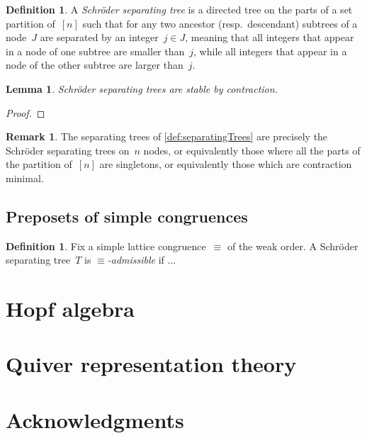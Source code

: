 \documentclass{amsart}
\newtheorem{lemma}[theorem]{Lemma}
\theoremstyle{definition}
\newtheorem{definition}[theorem]{Definition}
\newtheorem{remark}[theorem]{Remark}
\newcommand{\darkblue}{\color{darkblue}} %
\newcommand{\defn}[1]{\textsl{\darkblue #1}} %
\newcommand{\vincent}[1]{\todo[color=blue!30]{#1 \\ \hfill --- V.}}
\begin{document}
\begin{definition}
\label{def:ShcroderSeparatingTree}
A \defn{Schröder separating tree} is a directed tree on the parts of a set partition of~$[n]$ such that for any two ancestor (resp.~descendant) subtrees of a node~$J$ are separated by an integer~$j \in J$, meaning that all integers that appear in a node of one subtree are smaller than~$j$, while all integers that appear in a node of the other subtree are larger than~$j$.
\end{definition}

\begin{lemma}
\label{lem:contractionSchroderSeparatingTree}
Schröder separating trees are stable by contraction.
\end{lemma}

\begin{proof}
\vincent{todo}
\end{proof}

\begin{remark}
The separating trees of \cref{def:separatingTrees} are precisely the Schröder separating trees on~$n$ nodes, or equivalently those where all the parts of the partition of~$[n]$ are singletons, or equivalently those which are contraction minimal.
\end{remark}


\subsection{Preposets of simple congruences}
\label{subsec:preposetsSimpleCongruences}

\begin{definition}
\label{def:admissibleSchroderSeparatingTrees}
Fix a simple lattice congruence~$\equiv$ of the weak order.
A Schröder separating tree~$T$ is \defn{$\equiv$-admissible} if ...
\vincent{todo}
\end{definition}



\section{Hopf algebra}
\label{sec:HopfAlgebra}


\section{Quiver representation theory}
\label{subsec:representationTheory}


\section*{Acknowledgments}




\label{sec:biblio}
\end{document}
